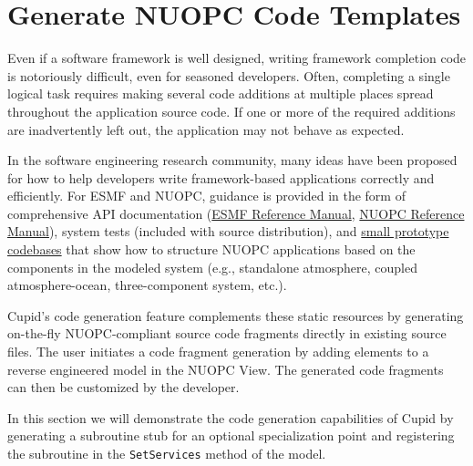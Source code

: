 \documentclass[oneside,11pt]{memoir}
\begin{document}
\begin{enumerate}
\end{enumerate}



\section{Generate NUOPC Code Templates}

Even if a software framework is well designed, writing framework completion code is notoriously difficult, even for seasoned developers. Often, completing a single logical task requires making several code additions at multiple places spread throughout the application source code. If one or more of the required additions are inadvertently left out, the application may not behave as expected.  

In the software engineering research community, many ideas have been proposed for how to help developers write framework-based applications correctly and efficiently. For ESMF and NUOPC, guidance is provided in the form of comprehensive API documentation (\href{http://www.earthsystemmodeling.org/esmf_releases/public/last/ESMF_refdoc/}{ESMF Reference Manual}, \href{https://earthsystemcog.org/projects/nuopc/refmans}{NUOPC Reference Manual}), system tests (included with source distribution), and \href{https://earthsystemcog.org/projects/nuopc/proto_codes}{small prototype codebases} that show how to structure NUOPC applications based on the components in the modeled system (e.g., standalone atmosphere, coupled atmosphere-ocean, three-component system, etc.). 

Cupid's code generation feature complements these static resources by generating on-the-fly NUOPC-compliant source code fragments directly in existing source files. The user initiates a code fragment generation by adding elements to a reverse engineered model in the NUOPC View. The generated code fragments can then be customized by the developer. 

In this section we will demonstrate the code generation capabilities of Cupid by generating a subroutine stub for an optional specialization point and registering the subroutine in the \texttt{SetServices} method of the model.
\end{document}
